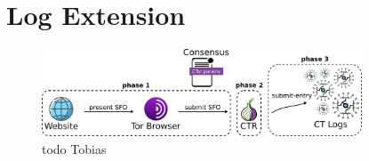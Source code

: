 \section{Log Extension} \label{sec:log}

%
%

%
%

%
%

%
%

%
%

%
%

\begin{figure}
    \centering
    \includegraphics[width=0.85\textwidth]{img/design-log}
    \caption{todo Tobias}
    \label{fig:design-log}
\end{figure}
